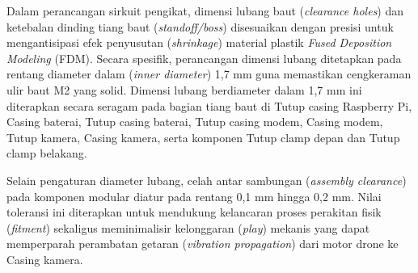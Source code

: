 Dalam perancangan sirkuit pengikat, dimensi lubang baut (\textit{clearance holes}) dan ketebalan dinding tiang baut (\textit{standoff/boss}) disesuaikan dengan presisi untuk mengantisipasi efek penyusutan (\textit{shrinkage}) material plastik \textit{Fused Deposition Modeling} (FDM). Secara spesifik, perancangan dimensi lubang ditetapkan pada rentang diameter dalam (\textit{inner diameter}) 1,7 mm guna memastikan cengkeraman ulir baut M2 yang solid. Dimensi lubang berdiameter dalam 1,7 mm ini diterapkan secara seragam pada bagian tiang baut di Tutup casing Raspberry Pi, Casing baterai, Tutup casing baterai, Tutup casing modem, Casing modem, Tutup kamera, Casing kamera, serta komponen Tutup clamp depan dan Tutup clamp belakang.

Selain pengaturan diameter lubang, celah antar sambungan (\textit{assembly clearance}) pada komponen modular diatur pada rentang 0,1 mm hingga 0,2 mm. Nilai toleransi ini diterapkan untuk mendukung kelancaran proses perakitan fisik (\textit{fitment}) sekaligus meminimalisir kelonggaran (\textit{play}) mekanis yang dapat memperparah perambatan getaran (\textit{vibration propagation}) dari motor drone ke Casing kamera.

